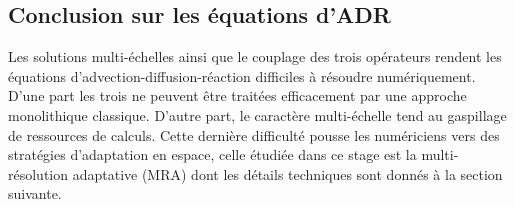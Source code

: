 \subsection{Conclusion sur les équations d'ADR}
Les solutions multi-échelles ainsi que le couplage des trois opérateurs
rendent les équations d'advection-diffusion-réaction difficiles à résoudre numériquement.
D'une part les trois ne peuvent être traitées efficacement par une approche monolithique classique. 
D'autre part, le caractère multi-échelle tend au gaspillage de ressources de calculs.
Cette dernière difficulté pousse les numériciens vers des stratégies d'adaptation en espace, 
celle étudiée dans ce stage est la multi-résolution adaptative (MRA) dont les détails techniques sont donnés à la section suivante.